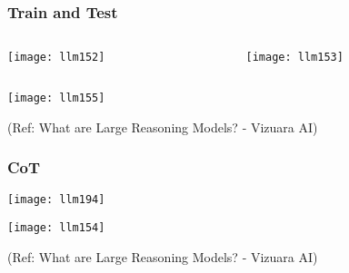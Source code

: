 \begin{frame}[fragile]\frametitle{Train and Test}


\begin{columns}
    \begin{column}[T]{0.5\linewidth}
		\begin{center}
		\texttt{[image: llm152]}
		\end{center}

    \end{column}
    \begin{column}[T]{0.5\linewidth}
		\begin{center}
		\texttt{[image: llm153]}
		\end{center}
    \end{column}
  \end{columns}
  
  		\begin{center}
		\texttt{[image: llm155]}
		\end{center}

{\tiny (Ref: What are Large Reasoning Models? - Vizuara AI)}

\end{frame}

\begin{frame}[fragile]\frametitle{CoT}


		\begin{center}
		\texttt{[image: llm194]}
		\end{center}


		\begin{center}
		\texttt{[image: llm154]}		
		\end{center}  
  


{\tiny (Ref: What are Large Reasoning Models? - Vizuara AI)}

\end{frame}


